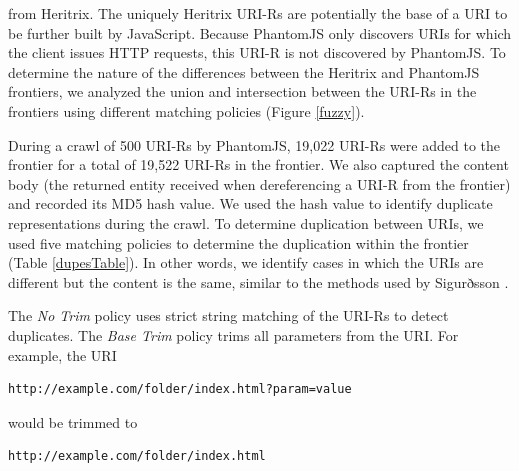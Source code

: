 \documentclass{ipres_proc_article-sp}
\begin{document}
\noindent from Heritrix. The uniquely Heritrix URI-Rs are potentially the base of a URI to be further built by JavaScript.  Because PhantomJS only discovers URIs for which the client issues HTTP requests, this URI-R is not discovered by PhantomJS. To determine the nature of the differences between the Heritrix and PhantomJS frontiers, we analyzed the union and intersection between the URI-Rs in the frontiers using different matching policies (Figure \ref{fuzzy}). %

During a crawl of 500 URI-Rs by PhantomJS, 19,022 URI-Rs were added to the frontier for a total of 19,522 URI-Rs in the frontier. We also captured the content body (the returned entity received when dereferencing a URI-R from the frontier) and recorded its MD5 hash value. We used the hash value to identify duplicate representations during the crawl. To determine duplication between URIs, we used five matching policies to determine the duplication within the frontier (Table \ref{dupesTable}). In other words, we identify cases in which the URIs are different but the content is the same, similar to the methods used by Sigurðsson \cite{uriDupes, uriDupes2}.

The \emph{No Trim} policy uses strict string matching of the URI-Rs to detect duplicates. The \emph{Base Trim} policy trims all parameters from the URI. For example, the URI 

\begin{verbatim}
http://example.com/folder/index.html?param=value 
\end{verbatim}

\noindent would be trimmed to 

\begin{verbatim}
http://example.com/folder/index.html
\end{verbatim} 
\end{document}
